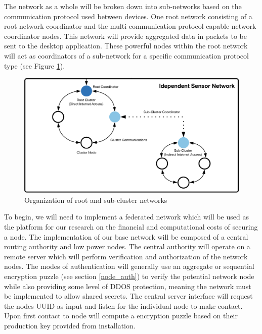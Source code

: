 \documentclass[tikz,a4paper,titlepage]{article}
\begin{document}
The network as a whole will be broken down into sub-networks based on the communication protocol used between devices. One root network consisting of a root network coordinator and the multi-communication protocol capable network coordinator nodes. This network will provide aggregated data in packets to be sent to the desktop application. These powerful nodes within the root network will act as coordinators of a sub-network for a specific communication protocol type (see Figure \ref{fig:isn}).


\begin{figure}[h]
  \centering
    \includegraphics[width=.9\linewidth]{Images/draft-brypt-architecture-isn.png}
  \caption{Organization of root and sub-cluster networks}
  \label{fig:isn}
\end{figure}


To begin, we will need to implement a federated network which will be used as the platform for our research on the financial and computational costs of securing a node. The implementation of our base network will be composed of a central routing authority and low power nodes. The central authority will operate on a remote server which will perform verification and authorization of the network nodes. The modes of authentication will generally use an aggregate or sequential encryption puzzle (see section \ref{node_auth}) to verify the potential network node while also providing some level of DDOS protection, meaning the network must be implemented to allow shared secrets. The central server interface will request the nodes UUID as input and listen for the individual node to make contact. Upon first contact to node will compute a encryption puzzle based on their production key provided from installation.
\end{document}
